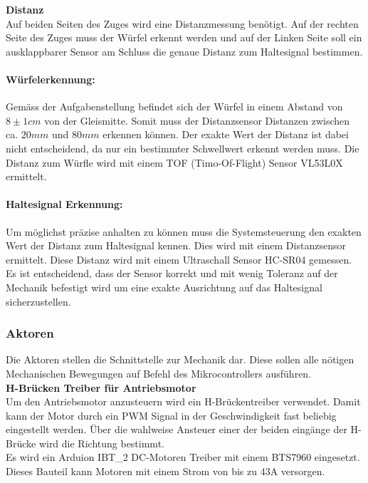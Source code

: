 \documentclass[../../main.tex]{subfiles}
\begin{document}
    \textbf{Distanz}\\
    Auf beiden Seiten des Zuges wird eine Distanzmessung benötigt. Auf der rechten Seite des Zuges muss der Würfel erkennt werden und auf der Linken Seite soll ein ausklappbarer Sensor am Schluss die genaue Distanz zum Haltesignal bestimmen.

    \paragraph{Würfelerkennung:}
    Gemäss der Aufgabenstellung befindet sich der Würfel in einem Abstand von $8\pm1cm$ von der Gleismitte. Somit muss der Distanzsensor Distanzen zwischen ca. $20mm$ und $80mm$ erkennen können. Der exakte Wert der Distanz ist dabei nicht entscheidend, da nur ein bestimmter Schwellwert erkennt werden muss. Die Distanz zum Würfle wird mit einem TOF (Timo-Of-Flight) Sensor VL53L0X ermittelt.

    \paragraph{Haltesignal Erkennung:}
    Um möglichst präzise anhalten zu können muss die Systemsteuerung den exakten Wert der Distanz zum Haltesignal kennen. Dies wird mit einem Distanzsensor ermittelt. Diese Distanz wird mit einem Ultraschall Sensor HC-SR04 gemessen. Es ist entscheidend, dass der Sensor korrekt und mit wenig Toleranz auf der Mechanik befestigt wird um eine exakte Ausrichtung auf das Haltesignal sicherzustellen.

    \subsubsection{Aktoren}
    Die Aktoren stellen die Schnittstelle zur Mechanik dar. Diese sollen alle nötigen Mechanischen Bewegungen auf Befehl des Mikrocontrollers ausführen.\\

    \textbf{H-Brücken Treiber für Antriebsmotor}\\
    Um den Antriebsmotor anzusteuern wird ein H-Brückentreiber verwendet. Damit kann der Motor durch ein PWM Signal in der Geschwindigkeit fast beliebig eingestellt werden. Über die wahlweise Ansteuer einer der beiden eingänge der H-Brücke wird die Richtung bestimmt.\\
    Es wird ein Arduion IBT\_2 DC-Motoren Treiber mit einem BTS7960 eingesetzt. Dieses Bauteil kann Motoren mit einem Strom von bis zu 43A versorgen. \\
\end{document}
